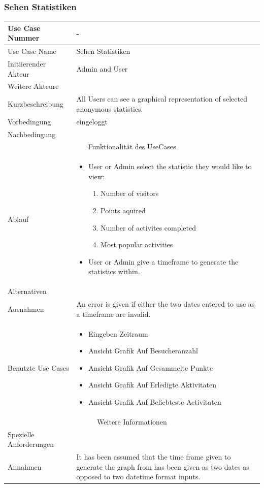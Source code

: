 \documentclass[10pt,a4paper]{article}
\begin{document}
	\subsubsection{Sehen Statistiken}
	\begin{tabular}{|l|p{.5\linewidth}|}
	\hline Use Case Nummer & - \\ 
	\hline Use Case Name & Sehen Statistiken \\ 
	\hline Initiierender Akteur & Admin and User \\
	\hline Weitere Akteure &  \\
	\hline Kurzbeschreibung & All Users can see a graphical representation of selected anonymous statistics. \\
	\hline Vorbedingung & eingeloggt \\
	\hline Nachbedingung &   \\
	\hline \multicolumn{2}{|c|}{Funktionalität des UseCases}\\
	\hline Ablauf & \begin{itemize}
			\item User or Admin select the statistic they would like to view:
				\begin{enumerate}
					\item Number of visitors
					\item Points aquired
					\item Number of activites completed
					\item Most popular activities
				\end{enumerate}
			\item User or Admin give a timeframe to generate the statistics within.
		\end{itemize} \\
	\hline Alternativen &  \\
	\hline Ausnahmen & An error is given if either the two dates entered to use as a timeframe are invalid. \\
	\hline Benutzte Use Cases & \begin{itemize} 
		\item Eingeben Zeitraum
		\item Ansicht Grafik Auf
Besucheranzahl
\item Ansicht Grafik Auf
Gesammelte Punkte
\item Ansicht Grafik Auf Erledigte Aktivitaten
\item Ansicht Grafik Auf Beliebteste Activitaten
	\end{itemize} \\
	\hline \multicolumn{2}{|c|}{Weitere Informationen} \\
	\hline Spezielle Anforderungen &  \\
	\hline Annahmen & It has been assumed that the time frame given to generate the graph from has been given as two dates as opposed to two datetime format inputs. \\
	\hline
	\end{tabular}
	
\end{document}
